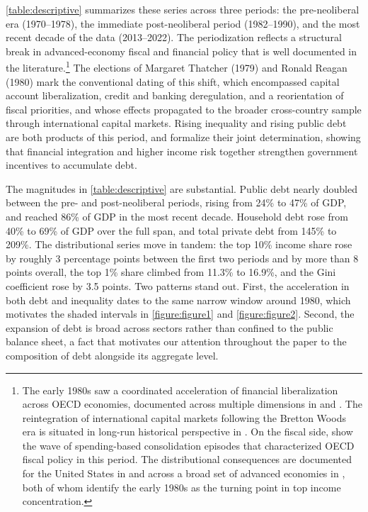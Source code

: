 \documentclass[12pt, titlepage]{article}
\numberwithin{equation}{section}
\begin{document}
\autoref{table:descriptive} summarizes these series across three periods: the
pre-neoliberal era (1970--1978), the immediate post-neoliberal period
(1982--1990), and the most recent decade of the data (2013--2022). The
periodization reflects a structural break in advanced-economy fiscal and
financial policy that is well documented in the
literature.\footnote{The early 1980s saw a coordinated acceleration of
	financial liberalization across OECD economies, documented across multiple
	dimensions in \cite{Abiad2010} and \cite{Quinn1997}. The reintegration of
	international capital markets following the Bretton Woods era is situated in
	long-run historical perspective in \cite{ObstfeldTaylor2004}. On the fiscal
	side, \cite{Alesina1995} show the wave of spending-based consolidation
	episodes that characterized OECD fiscal policy in this period. The
	distributional consequences are documented for the United States in
	\cite{PikettyS2003} and across a broad set of advanced economies in
	\cite{Atkinson2011}, both of whom identify the early 1980s as the turning
	point in top income concentration.} The elections of Margaret Thatcher (1979)
and Ronald Reagan (1980) mark the conventional dating of this shift, which
encompassed capital account liberalization, credit and banking deregulation,
and a reorientation of fiscal priorities, and whose effects propagated to the
broader cross-country sample through international capital markets. Rising
inequality and rising public debt are both products of this period, and
\cite{Azzimonti2014} formalize their joint determination, showing that
financial integration and higher income risk together strengthen government
incentives to accumulate debt.

The magnitudes in \autoref{table:descriptive} are substantial. Public debt
nearly doubled between the pre- and post-neoliberal periods, rising from 24\%
to 47\% of GDP, and reached 86\% of GDP in the most recent decade. Household
debt rose from 40\% to 69\% of GDP over the full span, and total private debt
from 145\% to 209\%. The distributional series move in tandem: the top 10\%
income share rose by roughly 3 percentage points between the first two periods
and by more than 8 points overall, the top 1\% share climbed from 11.3\% to
16.9\%, and the Gini coefficient rose by 3.5 points. Two patterns stand out.
First, the acceleration in both debt and inequality dates to the same narrow
window around 1980, which motivates the shaded intervals in
\autoref{figure:figure1} and \autoref{figure:figure2}. Second, the expansion
of debt is broad across sectors rather than confined to the public balance
sheet, a fact that motivates our attention throughout the paper to the
composition of debt alongside its aggregate level.
\end{document}
